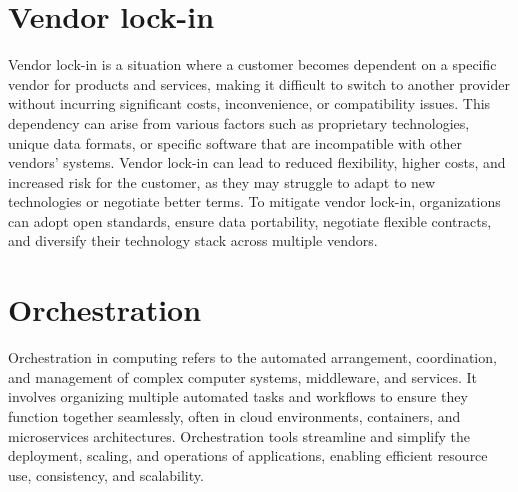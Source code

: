 




\section{Vendor lock-in}

Vendor lock-in is a situation where a customer becomes dependent on a specific vendor for products and services,
making it difficult to switch to another provider without incurring significant costs, inconvenience,
or compatibility issues. This dependency can arise from various factors such as proprietary technologies,
unique data formats, or specific software that are incompatible with other vendors' systems.
Vendor lock-in can lead to reduced flexibility, higher costs, and increased risk for the customer,
as they may struggle to adapt to new technologies or negotiate better terms. To mitigate vendor lock-in, organizations can adopt open standards, ensure data portability, negotiate flexible contracts, and diversify their technology stack across multiple vendors.


\section{Orchestration}
Orchestration in computing refers to the automated arrangement, coordination, and management of complex computer systems, middleware, and services. It involves organizing multiple automated tasks and workflows to ensure they function together seamlessly, often in cloud environments, containers, and microservices architectures. Orchestration tools streamline and simplify the deployment, scaling, and operations of applications, enabling efficient resource use, consistency, and scalability.




